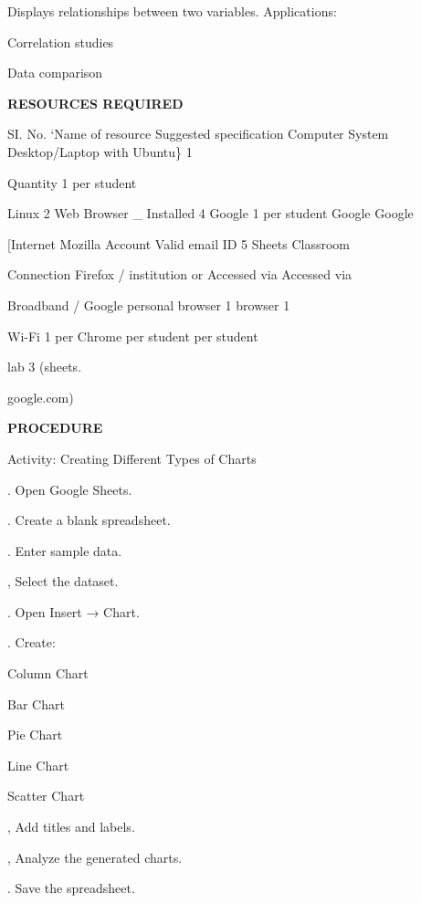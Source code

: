 \documentclass[10pt,a4paper]{article}
\begin{document}
\noindent Displays relationships between two variables. Applications:\par
\noindent\textbullet\; Correlation studies\par
\noindent\textbullet\; Data comparison\par

\medskip\noindent\textbf{RESOURCES REQUIRED}\par
\noindent SI. No. ‘Name of resource Suggested specification       Computer System Desktop/Laptop with Ubuntu\} 1\par
\noindent Quantity 1                                              per student\par

\noindent Linux 2         Web Browser     \_ Installed 4   Google           1 per student   Google         Google\par
\noindent [Internet       Mozilla                         Account Valid    email ID 5      Sheets         Classroom\par
\noindent Connection      Firefox /                       institution or                   Accessed via   Accessed via\par
\noindent Broadband /     Google                          personal                         browser 1      browser 1\par
\noindent Wi-Fi 1 per     Chrome                                                           per student    per student\par
\noindent lab 3                                                                            (sheets.\par
\noindent google.com)\par
{}\par

\medskip\noindent\textbf{PROCEDURE}\par
\noindent Activity: Creating Different Types of Charts\par
{}. Open Google Sheets.\par
{}. Create a blank spreadsheet.\par
{}. Enter sample data.\par
{}, Select the dataset.\par
{}. Open Insert → Chart.\par
{}. Create:\par
\noindent\textbullet\; Column Chart\par
\noindent\textbullet\; Bar Chart\par
\noindent\textbullet\; Pie Chart\par
\noindent\textbullet\; Line Chart\par
\noindent\textbullet\; Scatter Chart\par
{}, Add titles and labels.\par
{}, Analyze the generated charts.\par
{}. Save the spreadsheet.\par
\end{document}
